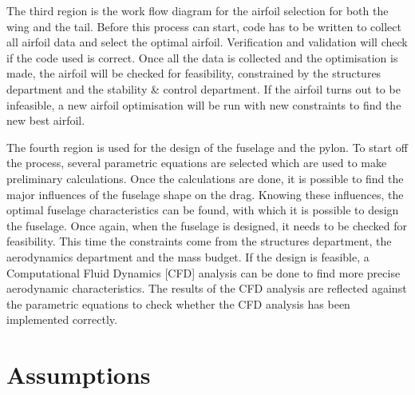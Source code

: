 The third region is the work flow diagram for the airfoil selection for both the wing and the tail. Before this process can start, code has to be written to collect all airfoil data and select the optimal airfoil. Verification and validation will check if the code used is correct. Once all the data is collected and the optimisation is made, the airfoil will be checked for feasibility, constrained by the structures department and the stability \& control department. If the airfoil turns out to be infeasible, a new airfoil optimisation will be run with new constraints to find the new best airfoil.

The fourth region is used for the design of the fuselage and the pylon. To start off the process, several parametric equations are selected which are used to make preliminary calculations. Once the calculations are done, it is possible to find the major influences of the fuselage shape on the drag. Knowing these influences, the optimal fuselage characteristics can be found, with which it is possible to design the fuselage. Once again, when the fuselage is designed, it needs to be checked for feasibility. This time the constraints come from the structures department, the aerodynamics department and the mass budget. If the design is feasible, a Computational Fluid Dynamics [CFD] analysis can be done to find more precise aerodynamic characteristics. The results of the CFD analysis are reflected against the parametric equations to check whether the CFD analysis has been implemented correctly.


\section{Assumptions}

